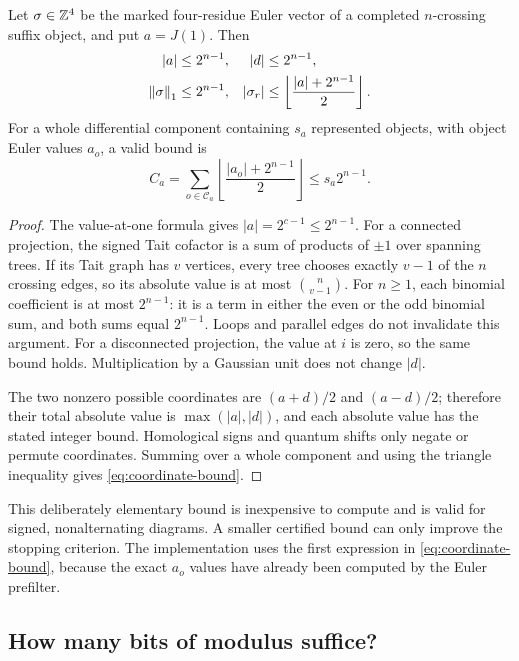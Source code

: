 \begin{proposition}
\label{prop:coordinate-bounds}
Let $\sigma\in\mathbb Z^4$ be the marked four-residue Euler vector of a completed
$n$-crossing suffix object, and put $a=J(1)$. Then
\begin{align}
 |a|&\le 2^{n-1}, & |d|&\le 2^{n-1},\\
 \left\lVert \sigma\right\rVert_1&\le2^{n-1}, &
 |\sigma_r|&\le\left\lfloor\frac{|a|+2^{n-1}}2\right\rfloor.
 \label{eq:object-bounds}
\end{align}
For a whole differential component containing $s_a$ represented objects,
with object Euler values $a_o$, a valid bound is
\begin{equation}
 C_a=\sum_{o\in\mathcal C_a}
       \left\lfloor\frac{|a_o|+2^{n-1}}2\right\rfloor
       \le s_a2^{n-1}.
 \label{eq:coordinate-bound}
\end{equation}
\end{proposition}
\begin{proof}
The value-at-one formula gives $|a|=2^{c-1}\le2^{n-1}$. For a connected
projection, the signed Tait cofactor is a sum of products of $\pm1$ over
spanning trees. If its Tait graph has $v$ vertices, every tree chooses exactly
$v-1$ of the $n$ crossing edges, so its absolute value is at most
$\binom{n}{v-1}$. For $n\ge1$, each binomial coefficient is at most
$2^{n-1}$: it is a term in either the even or the odd binomial sum, and both
sums equal $2^{n-1}$. Loops and parallel edges do not invalidate this argument.
For a disconnected projection, the value at $i$ is zero, so the same bound
holds. Multiplication by a Gaussian unit does not change $|d|$.

The two nonzero possible coordinates are $(a+d)/2$ and $(a-d)/2$; therefore
their total absolute value is $\max(|a|,|d|)$, and each absolute value has
the stated integer bound. Homological signs and quantum shifts only negate
or permute coordinates. Summing over a whole component and using the triangle
inequality gives \cref{eq:coordinate-bound}.
\end{proof}

This deliberately elementary bound is inexpensive to compute and is valid for
signed, nonalternating diagrams. A smaller certified bound can only improve
the stopping criterion. The implementation uses the first expression in
\cref{eq:coordinate-bound}, because the exact $a_o$ values have already been
computed by the Euler prefilter.

\subsection{How many bits of modulus suffice?}

